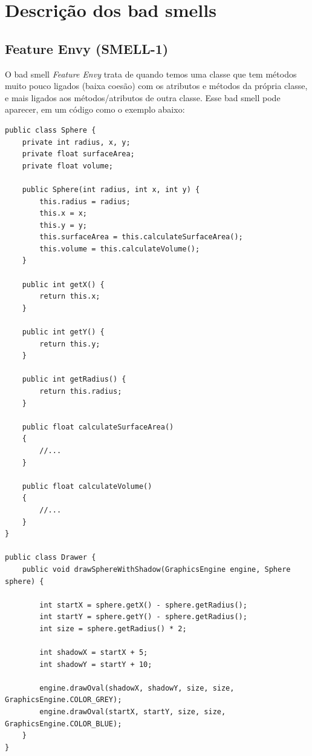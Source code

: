 \documentclass[12pt,a4paper]{article}
\newcommand{\smell}[1]{\textit{#1}}
\begin{document}
\section{Descrição dos bad smells}

\subsection{Feature Envy (SMELL-1)}

O bad smell \smell{Feature Envy} trata de quando temos uma classe que tem métodos muito pouco ligados (baixa coesão) com os atributos e métodos da própria classe, e mais ligados aos métodos/atributos de outra classe. Esse bad smell pode aparecer, em um código como o exemplo abaixo:

\begin{lstlisting}[caption={Feature Envy: antes da refatoração},label={lst:sphere-before}]
public class Sphere {
    private int radius, x, y;
    private float surfaceArea;
    private float volume;

    public Sphere(int radius, int x, int y) {
        this.radius = radius;
        this.x = x;
        this.y = y;
        this.surfaceArea = this.calculateSurfaceArea();
        this.volume = this.calculateVolume();
    }

    public int getX() {
        return this.x;
    }

    public int getY() {
        return this.y;
    }

    public int getRadius() {
        return this.radius;
    }

    public float calculateSurfaceArea()
    {
        //...
    }

    public float calculateVolume()
    {
        //...
    }
}

public class Drawer {
    public void drawSphereWithShadow(GraphicsEngine engine, Sphere sphere) {

        int startX = sphere.getX() - sphere.getRadius();
        int startY = sphere.getY() - sphere.getRadius();
        int size = sphere.getRadius() * 2;

        int shadowX = startX + 5;
        int shadowY = startY + 10;

        engine.drawOval(shadowX, shadowY, size, size, GraphicsEngine.COLOR_GREY);
        engine.drawOval(startX, startY, size, size, GraphicsEngine.COLOR_BLUE);
    }
}

\end{lstlisting}
\end{document}
